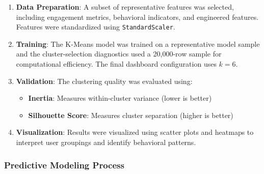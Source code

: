 \documentclass[12pt,a4paper]{article}
\begin{document}
\begin{enumerate}
    \item \textbf{Data Preparation}:
    A subset of representative features was selected, including engagement metrics, behavioral indicators, and engineered features. Features were standardized using \texttt{StandardScaler}.
    
    \item \textbf{Training}:
    The K-Means model was trained on a representative model sample and the cluster-selection diagnostics used a 20{,}000-row sample for computational efficiency. The final dashboard configuration uses $k = 6$.
    
    \item \textbf{Validation}:
    The clustering quality was evaluated using:
    \begin{itemize}
        \item \textbf{Inertia}: Measures within-cluster variance (lower is better)
        \item \textbf{Silhouette Score}: Measures cluster separation (higher is better)
    \end{itemize}
    
    \item \textbf{Visualization}:
    Results were visualized using scatter plots and heatmaps to interpret user groupings and identify behavioral patterns.
\end{enumerate}

\subsubsection{Predictive Modeling Process}
\end{document}
